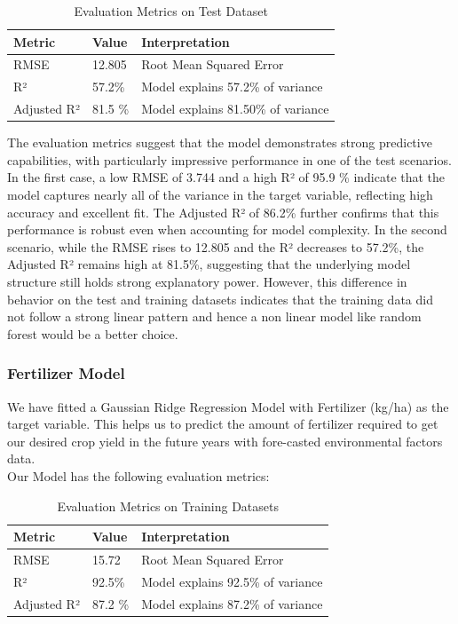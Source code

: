 \begin{table}[h]
\centering
\caption{Evaluation Metrics on Test Dataset}
\begin{tabular}{lll}
\toprule
\textbf{Metric} & \textbf{Value} & \textbf{Interpretation} \\
\midrule
RMSE & 12.805 & Root Mean Squared Error \\
R² & 57.2\% & Model explains 57.2\% of variance\\
Adjusted R² & 81.5 \%  & Model explains 81.50\% of variance\\
\bottomrule
\end{tabular}
\end{table}

The evaluation metrics suggest that the model demonstrates strong predictive capabilities, with particularly impressive performance in one of the test scenarios. In the first case, a low RMSE of 3.744 and a high R² of 95.9 \% indicate that the model captures nearly all of the variance in the target variable, reflecting high accuracy and excellent fit. The Adjusted R² of 86.2\% further confirms that this performance is robust even when accounting for model complexity. In the second scenario, while the RMSE rises to 12.805 and the R² decreases to 57.2\%, the Adjusted R² remains high at 81.5\%, suggesting that the underlying model structure still holds strong explanatory power. However, this difference in behavior on the test and training datasets indicates that the training data did not follow a strong linear pattern and hence a non linear model like random forest would be a better choice. 

\subsubsection{Fertilizer Model}

We have fitted a Gaussian Ridge Regression Model with Fertilizer (kg/ha) as the target variable. This helps us to predict the amount of fertilizer required to get our desired crop yield in the future years with fore-casted environmental factors data. \\

\noindent Our Model has the following evaluation metrics:

\begin{table}[h]
\centering
\caption{Evaluation Metrics on Training Datasets}
\begin{tabular}{lll}
\toprule
\textbf{Metric} & \textbf{Value} & \textbf{Interpretation} \\
\midrule
RMSE & 15.72 & Root Mean Squared Error \\
R² & 92.5\% & Model explains 92.5\% of variance\\
Adjusted R² & 87.2 \%  & Model explains 87.2\% of variance\\
\bottomrule
\end{tabular}
\end{table}


